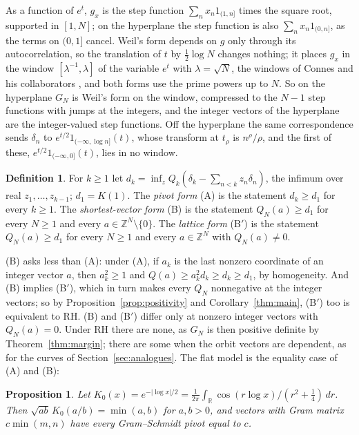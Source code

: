 \documentclass[11pt]{article}
\newtheorem{proposition}[theorem]{Proposition}
\theoremstyle{definition}
\newtheorem{definition}[theorem]{Definition}
\newcommand{\KH}{K}
\begin{document}
As a function of $e^t$, $g_x$ is the step function $\sum_n x_n 1_{(1, n]}$ times the square root, supported in $[1,
N]$; on the hyperplane the step function is also $\sum_n x_n 1_{(0, n]}$, as the terms on $(0, 1]$ cancel. Weil's
form depends on $g$ only through its autocorrelation, so the translation of $t$ by $\frac12\log N$ changes nothing;
it places $g_x$ in the window $[\lambda^{-1}, \lambda]$ of the variable $e^t$ with $\lambda = \sqrt N$, the windows
of Connes and his collaborators \cite{connes-consani21, acl26}, and both forms use the prime powers up to $N$. So on
the hyperplane $G_N$ is Weil's form on the window, compressed to the $N - 1$ step functions with jumps at the
integers, and the integer vectors of the hyperplane are the integer-valued step functions. Off the hyperplane the
same correspondence sends $\delta_n$ to $e^{t/2} 1_{(-\infty, \log n]}(t)$, whose transform at $t_\rho$ is
$n^\rho/\rho$, and the first of these, $e^{t/2} 1_{(-\infty, 0]}(t)$, lies in no window.

\begin{definition}\label{def:forms}
For $k \ge 1$ let $d_k = \inf_z Q_k(\delta_k - \sum_{n < k} z_n \delta_n)$, the infimum over real $z_1, \dots, z_{k -
1}$; $d_1 = \KH(1)$. The \emph{pivot form} (A) is the statement $d_k \ge d_1$ for every $k \ge 1$. The
\emph{shortest-vector form} (B) is the statement $Q_N(a) \ge d_1$ for every $N \ge 1$ and every $a \in \mathbb Z^N
\setminus \{0\}$. The \emph{lattice form} (B$'$) is the statement $Q_N(a) \ge d_1$ for every $N \ge 1$ and every $a \in
\mathbb Z^N$ with $Q_N(a) \ne 0$.
\end{definition}

(B) asks less than (A): under (A), if $a_k$ is the last nonzero coordinate of an integer vector $a$, then $a_k^2 \ge 1$
and $Q(a) \ge a_k^2 d_k \ge d_k \ge d_1$, by homogeneity. And (B) implies (B$'$), which in turn makes every $Q_N$
nonnegative at the integer vectors; so by Proposition~\ref{prop:positivity} and Corollary~\ref{thm:main}, (B$'$) too is
equivalent to RH. (B) and (B$'$) differ only at nonzero integer vectors with $Q_N(a) = 0$. Under RH there are none, as
$G_N$ is then positive definite by Theorem~\ref{thm:margin}; there are some when the orbit vectors are dependent, as
for the curves of Section~\ref{sec:analogues}. The flat model is the equality case of (A) and (B):

\begin{proposition}\label{prop:flat}
Let $\KH_0(x) = e^{-|\log x|/2} = \frac{1}{2\pi} \int_{\mathbb R} \cos(r \log x)/(r^2 + \frac14)\,dr$. Then
$\sqrt{ab}\,\KH_0(a/b) = \min(a, b)$ for $a, b > 0$, and
vectors with Gram matrix $c \min(m, n)$ have every Gram--Schmidt
pivot equal to $c$.
\end{proposition}
\end{document}
